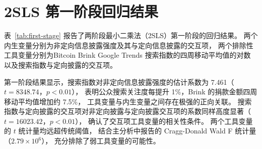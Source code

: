 \documentclass[
    type = master, %
    degree = professional,        %
    decl-page,  %
    twoside,                %
    fontset = fandol %
  ]{njuthesis}
\begin{document}
\chapter{2SLS 第一阶段回归结果}

表~\ref{tab:first-stage} 报告了两阶段最小二乘法（2SLS）第一阶段的回归结果。
两个内生变量分别为非定向信息披露强度及其与定向信息披露的交互项，
两个排除性工具变量分别为Bitcoin Brink Google Trends 搜索指数的四周移动平均值的对数
以及搜索指数与定向披露的交互项。

第一阶段结果显示，搜索指数对非定向信息披露强度的估计系数为 7.461（$t = 8348.74$，$p < 0.01$），
表明公众搜索关注度每提升 1\%，Brink 的捐款金额四周移动平均值增加约 7.5\%，
工具变量与内生变量之间存在极强的正向关联。
搜索指数与定向披露的交互项对非定向披露与定向披露交互项的系数同样高度显著（$t = 16023.42$，$p < 0.01$），
确认了交互项工具变量的相关性条件。
两个工具变量的 $t$ 统计量均远超传统阈值，
结合主分析中报告的 Cragg-Donald Wald F 统计量（$2.79 \times 10^6$），
充分排除了弱工具变量的可能性。
\end{document}

